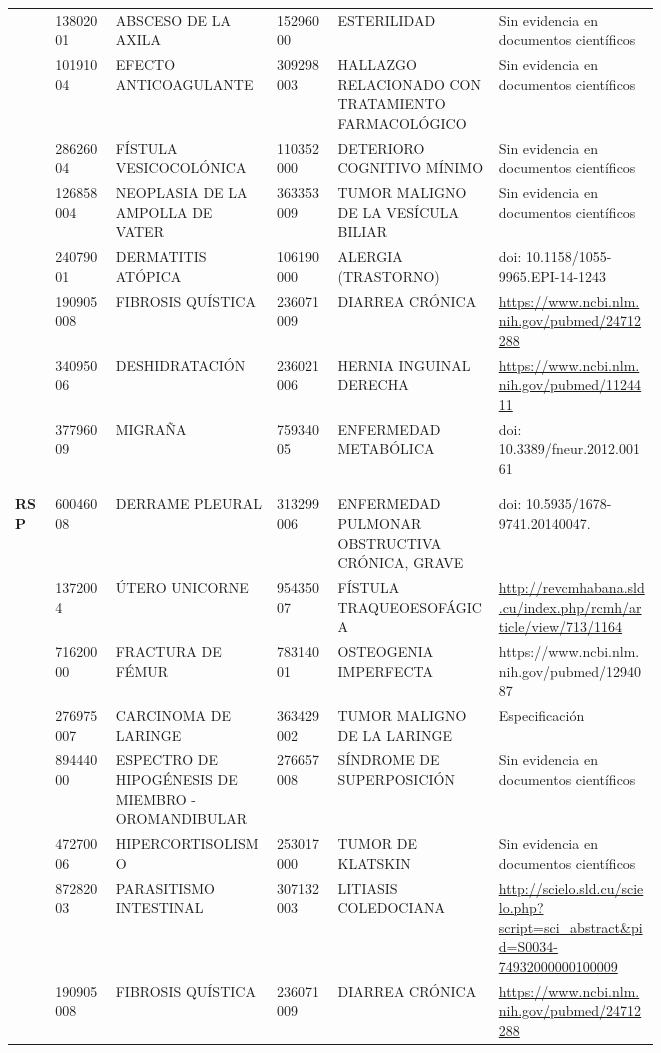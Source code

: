 \begin{landscape}
\begin{longtable}[c]{@{}llp{0.25\linewidth}lp{0.25\linewidth}p{0.25\linewidth}@{}}
 & 13802001 & ABSCESO DE LA AXILA & 15296000 & ESTERILIDAD & Sin evidencia en documentos científicos \\
 & 10191004 & EFECTO ANTICOAGULANTE & 309298003 & HALLAZGO RELACIONADO CON TRATAMIENTO FARMACOLÓGICO & Sin evidencia en documentos científicos \\
 & 28626004 & FÍSTULA VESICOCOLÓNICA & 110352000 & DETERIORO COGNITIVO MÍNIMO & Sin evidencia en documentos científicos \\
 & 126858004 & NEOPLASIA DE LA AMPOLLA DE VATER & 363353009 & TUMOR MALIGNO DE LA VESÍCULA BILIAR & Sin evidencia en documentos científicos \\
 & 24079001 & DERMATITIS ATÓPICA & 106190000 & ALERGIA (TRASTORNO) & doi:  10.1158/1055-9965.EPI-14-1243 \\
 & 190905008 & FIBROSIS QUÍSTICA & 236071009 & DIARREA CRÓNICA & \url{https://www.ncbi.nlm.nih.gov/pubmed/24712288} \\
 & 34095006 & DESHIDRATACIÓN & 236021006 & HERNIA INGUINAL DERECHA & \url{https://www.ncbi.nlm.nih.gov/pubmed/1124411} \\
 & 37796009 & MIGRAÑA & 75934005 & ENFERMEDAD METABÓLICA & doi:  10.3389/fneur.2012.00161 \\ \\ \\
\multirow{44}{*}{\textbf{RSP}} & 60046008 & DERRAME PLEURAL & 313299006 & ENFERMEDAD PULMONAR OBSTRUCTIVA CRÓNICA, GRAVE & doi: 10.5935/1678-9741.20140047. \\
 & 1372004 & ÚTERO UNICORNE & 95435007 & FÍSTULA TRAQUEOESOFÁGICA & \url{http://revcmhabana.sld.cu/index.php/rcmh/article/view/713/1164} \\
 & 71620000 & FRACTURA DE FÉMUR & 78314001 & OSTEOGENIA IMPERFECTA & https://www.ncbi.nlm.nih.gov/pubmed/1294087 \\
 & 276975007 & CARCINOMA DE LARINGE & 363429002 & TUMOR MALIGNO DE LA LARINGE & Especificación \\
 & 89444000 & ESPECTRO DE HIPOGÉNESIS DE MIEMBRO - OROMANDIBULAR & 276657008 & SÍNDROME DE SUPERPOSICIÓN & Sin evidencia en documentos científicos \\
 & 47270006 & HIPERCORTISOLISMO & 253017000 & TUMOR DE KLATSKIN & Sin evidencia en documentos científicos \\
 & 87282003 & PARASITISMO INTESTINAL & 307132003 & LITIASIS COLEDOCIANA & \url{http://scielo.sld.cu/scielo.php?script=sci\_abstract\&pid=S0034-74932000000100009} \\
 & 190905008 & FIBROSIS QUÍSTICA & 236071009 & DIARREA CRÓNICA & \url{https://www.ncbi.nlm.nih.gov/pubmed/24712288} \\

\end{longtable}
\end{landscape}
